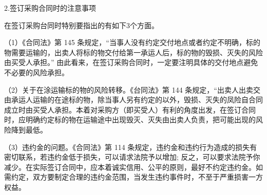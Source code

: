     2.签订采购合同时的注意事项

    在签订采购台同时特别要指出的有如下3个方面。

    （1）《合同法》第 145 条规定，“当事人没有约定交付地点或者约定不明确，标的物需要运输的，出卖人将标的物交付给第一承运人后，标的物的毁损、灭失的风险由买受人承担。” 由此看来，在签订采购合同时，一定要注明具体的交付地点避免不必要的风险承担。

    （2）关于在涂运输标的物的风险转移。《台同法》第 144 条规定，“出卖人出卖交由承运人运输的在途标的物，除当事人另有约定的以外，毁损、灭失的凤险自合同成立时由买受人承担。本着对采购方（即买受人）有利的角度出发，在签订合同时，应明确约定标的物在运输途中出现毁灭、灭失由出卖人负责，把可能出现的风险降到最低。

    （3）违约金的问题。《合同法》第 114 条规定，违约金和违约行为造成的损失有密切联系，若违约金低于损失，可以请求法院予以增加; 反之，可以要求法院予你减少。在实际签订合同中，应本着诚实信用、公平的原则，最好不约定违约金。如需约定，双方要制定合理的违约金范围，当发生违约事件时，不至于严重损害一方权益。
